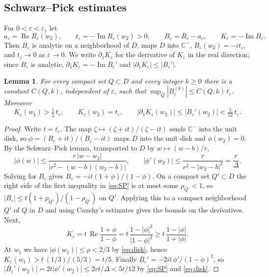 \documentclass[11pt]{amsart}
\numberwithin{equation}{section}
\newtheorem{lemma}[theorem]{Lemma}
\theoremstyle{definition}
\theoremstyle{remark}
\newcommand{\Cm}{\mathbb C^{-}}
\renewcommand{\Re}{\operatorname{Re}}
\renewcommand{\Im}{\operatorname{Im}}
\begin{document}
\subsection{Schwarz--Pick estimates}
For $0<\varepsilon<\varepsilon_1$ let
\[
a_\varepsilon=\Re R_\varepsilon(w_2),\qquad t_\varepsilon=-\Im R_\varepsilon(w_2)>0,\qquad B_\varepsilon=R_\varepsilon-a_\varepsilon,\qquad K_\varepsilon=-\Im B_\varepsilon .
\]
Then $B_\varepsilon$ is analytic on a neighborhood of $\overline D$, maps $D$ into $\Cm$, $B_\varepsilon(w_2)=-it_\varepsilon$, and $t_\varepsilon\to0$ as $\varepsilon\to0$. We write $\partial_1K_\varepsilon$ for the derivative of $K_\varepsilon$ in the real direction; since $B_\varepsilon$ is analytic, $\partial_1K_\varepsilon=-\Im B_\varepsilon'$ and $|\partial_1K_\varepsilon|\le|B_\varepsilon'|$.

\begin{lemma}\label{lem:SP}
For every compact set $Q\subset D$ and every integer $k\ge0$ there is a constant $C(Q,k)$, independent of $\varepsilon$, such that $\sup_Q|B_\varepsilon^{(k)}|\le C(Q,k)\,t_\varepsilon$. Moreover
\[
K_\varepsilon(w_1)>\tfrac15\,t_\varepsilon,\qquad K_\varepsilon(w_2)=t_\varepsilon,\qquad |\partial_1K_\varepsilon(w_2)|\le|B_\varepsilon'(w_2)|<\tfrac5{12}\,t_\varepsilon .
\]
\end{lemma}

\begin{proof}
Write $t=t_\varepsilon$. The map $\zeta\mapsto(\zeta+it)/(\zeta-it)$ sends $\Cm$ into the unit disk, so $\phi=(B_\varepsilon+it)/(B_\varepsilon-it)$ maps $D$ into the unit disk and $\phi(w_2)=0$. By the Schwarz--Pick lemma, transported to $D$ by $w\mapsto(w-b)/r$,
\begin{equation}\label{eq:SP}
|\phi(w)|\le\frac{r\,|w-w_2|}{\bigl|r^2-(w-b)\overline{(w_2-b)}\bigr|},\qquad |\phi'(w_2)|\le\frac{r}{r^2-|w_2-b|^2}=\frac r\Delta .
\end{equation}
Solving for $B_\varepsilon$ gives $B_\varepsilon=-it(1+\phi)/(1-\phi)$. On a compact set $Q'\subset D$ the right side of the first inequality in \eqref{eq:SP} is at most some $\rho_{Q'}<1$, so $|B_\varepsilon|\le t(1+\rho_{Q'})/(1-\rho_{Q'})$ on $Q'$. Applying this to a compact neighborhood $Q'$ of $Q$ in $D$ and using Cauchy's estimates gives the bounds on the derivatives. Next,
\[
K_\varepsilon=t\,\Re\frac{1+\phi}{1-\phi}=t\,\frac{1-|\phi|^2}{|1-\phi|^2}\ge t\,\frac{1-|\phi|}{1+|\phi|}.
\]
At $w_1$ we have $|\phi(w_1)|\le\rho<2/3$ by \eqref{eq:disk}, hence $K_\varepsilon(w_1)>t\,(1/3)/(5/3)=t/5$. Finally $B_\varepsilon'=-2it\,\phi'/(1-\phi)^2$, so $|B_\varepsilon'(w_2)|=2t|\phi'(w_2)|\le2rt/\Delta<5t/12$ by \eqref{eq:SP} and \eqref{eq:disk}.
\end{proof}
\end{document}
